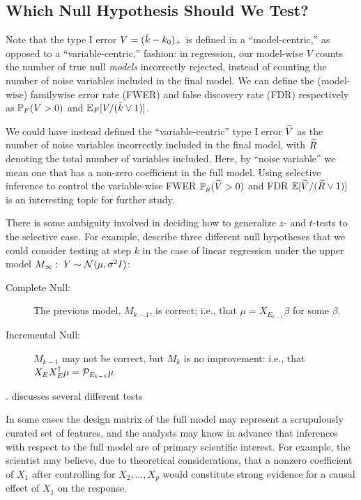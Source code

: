 \documentclass{article}
\begin{document}
\subsection{Which Null Hypothesis Should We Test?}

Note that the type I error $V=(\hk-k_0)_+$ is defined in a ``model-centric,'' as opposed to a ``variable-centric,'' fashion: in regression, our model-wise $V$ counts the number of true null {\em models} incorrectly rejected, instead of counting the number of noise variables included in the final model. We can define the (model-wise) familywise error rate (FWER) and false discovery rate (FDR) respectively as $\P_F(V >0)$ and $\E_F[V/(\hk \vee 1)]$. 

We could have instead defined the ``variable-centric'' type I error $\tV$ as the number of noise variables incorrectly included in the final model, with $\tR$ denoting the total number of variables included. Here, by ``noise variable'' we mean one that has a non-zero coefficient in the full model. Using selective inference to control the variable-wise FWER $\P_\mu(\tV>0)$ and FDR $\E[\tV / (\tR \vee 1)]$ is an interesting topic for further study.

There is some ambiguity involved in deciding how to generalize $z$- and $t$-tests to the selective case. For example, \citet{gsell2013sequential} describe three different null hypotheses that we could consider testing at step $k$ in the case of linear regression under the upper model $M_\infty:\; Y\sim \cN(\mu, \sigma^2 I)$:
\begin{description}
\item[Complete Null:] The previous model, $M_{k-1}$, is correct; i.e., that $\mu = X_{E_{k-1}}\beta$ for some $\beta$.
\item[Incremental Null:] $M_{k-1}$ may not be correct, but $M_k$ is no improvement: i.e., that $X_EX_E^\dagger\mu = \proj_{E_{k-1}}\mu$
\end{description}
. \citet{fithian2014optimal} discusses several different tests 

In some cases the design matrix of the full model may represent a  scrupulously curated set of features, and the analysts may know in advance that inferences with respect to the full model are of primary scientific interest. For example, the scientist may believe, due to theoretical considerations, that a nonzero coefficient of $X_1$ after controlling for $X_2,\ldots,X_p$ would constitute strong evidence for a causal effect of $X_1$ on the response.
\end{document}
